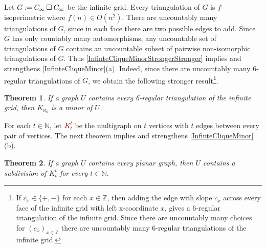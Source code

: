 \documentclass[a4paper,11pt]{article}
\newcommand{\defn}[1]{\textcolor{Maroon}{\emph{#1}}\index{#1}}
\theoremstyle{plain}
\newtheorem{thm}{Theorem}[section]
\theoremstyle{definition}
\newcommand{\CartProd}{\mathbin{\square}}
\newcommand{\PPP}{C_{\hspace{-0.15ex}\infty}}
\newcommand{\NN}{\mathbb{N}}
\newcommand{\ZZ}{\mathbb{Z}}
\begin{document}
Let $G:=\PPP\CartProd \PPP$ be the infinite grid. Every triangulation of $G$ is $f$-isoperimetric where $f(n)\in O(n^2)$. There are uncountably many triangulations of $G$, since in each face there are two possible edges to add. Since $G$ has only countably many automorphisms,  any uncountable set of triangulations of $G$  contains an uncountable subset of pairwise non-isomorphic triangulations of $G$. Thus \cref{InfinteCliqueMinorStrongerStronger} implies and strengthens \cref{InfinteCliqueMinor}(a). Indeed, since there are uncountably many 6-regular triangulations of $G$, we obtain the following stronger result\footnote{If $c_x\in\{+,-\}$ for each $x\in\ZZ$, then adding the edge with slope $c_x$ across  every face of the infinite grid with left x-coordinate $x$, gives a 6-regular triangulation of the infinite grid. Since there are uncountably many choices for $(c_x)_{x\in\ZZ}$ there are uncountably many 6-regular triangulations of the infinite grid.}.

\begin{thm}
\label{InfinteCliqueMinorDegree6}
If a graph $U$ contains every 6-regular triangulation of the infinite grid, then $K_{\aleph_0}$ is a minor of $U$.
\end{thm}

For each $t \in \NN$, let \defn{$K_t^t$} be the multigraph on $t$ vertices with $t$ edges between every pair of vertices.  The next theorem implies and strengthens \cref{InfinteCliqueMinor}(b). 

\begin{thm} \label{thm:finitesubdivision}
If a graph $U$ contains every planar graph, then $U$ contains a subdivision of $K_t^t$ for every $t \in \NN$.
\end{thm}
\end{document}
